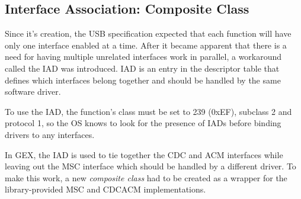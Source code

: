 \subsection{Interface Association: Composite Class}

Since it's creation, the \gls{USB} specification expected that each function will have only one interface enabled at a time. After it became apparent that there is a need for having multiple unrelated interfaces work in parallel, a workaround called the \gls{IAD} was introduced. \gls{IAD} is an entry in the descriptor table that defines which interfaces belong together and should be handled by the same software driver.

To use the \gls{IAD}, the function's class must be set to 239 (0xEF), subclass 2 and protocol 1, so the \gls{OS} knows to look for the presence of \glspl{IAD} before binding drivers to any interfaces. 


In GEX, the \gls{IAD} is used to tie together the \gls{CDC} and \gls{ACM} interfaces while leaving out the \gls{MSC} interface which should be handled by a different driver. To make this work, a new \textit{composite class} had to be created as a wrapper for the library-provided \gls{MSC} and \gls{CDCACM} implementations.





